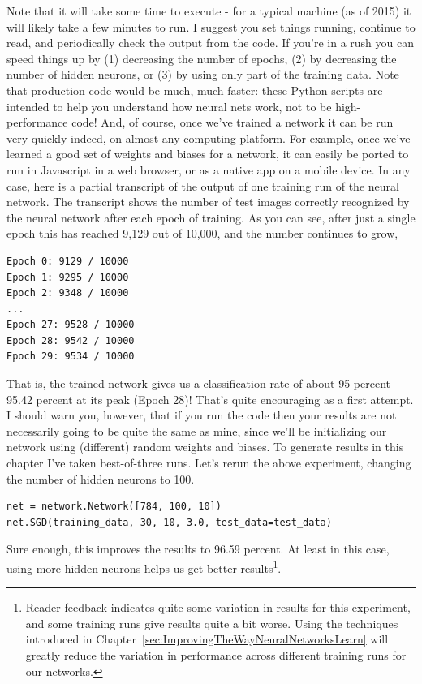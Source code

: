 Note that it will take some time to execute - for a typical machine (as of 2015) it will likely take a few minutes to run. I suggest you set things running, continue to read, and periodically check the output from the code. If you're in a rush you can speed things up by (1) decreasing the number of epochs, (2) by decreasing the number of hidden neurons, or (3) by using only part of the training data. Note that production code would be much, much faster: these Python scripts are intended to help you understand how neural nets work, not to be high-performance code! And, of course, once we've trained a network it can be run very quickly indeed, on almost any computing platform. For example, once we've learned a good set of weights and biases for a network, it can easily be ported to run in Javascript in a web browser, or as a native app on a mobile device. In any case, here is a partial transcript of the output of one training run of the neural network. The transcript shows the number of test images correctly recognized by the neural network after each epoch of training. As you can see, after just a single epoch this has reached 9,129 out of 10,000, and the number continues to grow,
\begin{lstlisting}
Epoch 0: 9129 / 10000
Epoch 1: 9295 / 10000
Epoch 2: 9348 / 10000
...
Epoch 27: 9528 / 10000
Epoch 28: 9542 / 10000
Epoch 29: 9534 / 10000
\end{lstlisting}
That is, the trained network gives us a classification rate of about 95 percent - 95.42 percent at its peak (Epoch 28)! That's quite encouraging as a first attempt. I should warn you, however, that if you run the code then your results are not necessarily going to be quite the same as mine, since we'll be initializing our network using (different) random weights and biases. To generate results in this chapter I've taken best-of-three runs.
Let's rerun the above experiment, changing the number of hidden neurons to 100. 
\begin{lstlisting}
net = network.Network([784, 100, 10])
net.SGD(training_data, 30, 10, 3.0, test_data=test_data)
\end{lstlisting}
Sure enough, this improves the results to 96.59 percent. At least in this case, using more hidden neurons helps us get better results\footnote{
Reader feedback indicates quite some variation in results for this experiment, and some training runs give results quite a bit worse. Using the techniques introduced in Chapter~\ref{sec:ImprovingTheWayNeuralNetworksLearn} will greatly reduce the variation in performance across different training runs for our networks.}.

